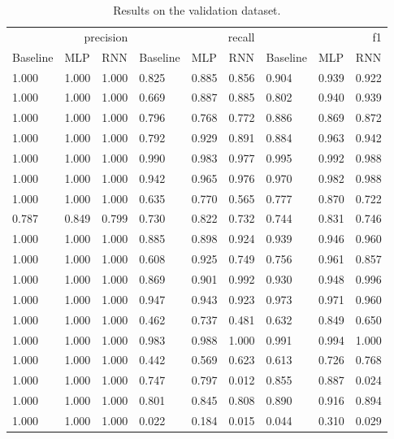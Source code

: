 \begin{table}
\caption{Results on the validation dataset.}
\label{tab::ex_2_valid}
\begin{tabular}{|l||l||l||l||l||l||l||l||l|}
\toprule
\multicolumn{3}{r}{precision} & \multicolumn{3}{r}{recall} & \multicolumn{3}{r}{f1} \\
Baseline & MLP & RNN & Baseline & MLP & RNN & Baseline & MLP & RNN \\
\midrule
1.000 & 1.000 & 1.000 & 0.825 & 0.885 & 0.856 & 0.904 & 0.939 & 0.922 \\
1.000 & 1.000 & 1.000 & 0.669 & 0.887 & 0.885 & 0.802 & 0.940 & 0.939 \\
1.000 & 1.000 & 1.000 & 0.796 & 0.768 & 0.772 & 0.886 & 0.869 & 0.872 \\
1.000 & 1.000 & 1.000 & 0.792 & 0.929 & 0.891 & 0.884 & 0.963 & 0.942 \\
1.000 & 1.000 & 1.000 & 0.990 & 0.983 & 0.977 & 0.995 & 0.992 & 0.988 \\
1.000 & 1.000 & 1.000 & 0.942 & 0.965 & 0.976 & 0.970 & 0.982 & 0.988 \\
1.000 & 1.000 & 1.000 & 0.635 & 0.770 & 0.565 & 0.777 & 0.870 & 0.722 \\
0.787 & 0.849 & 0.799 & 0.730 & 0.822 & 0.732 & 0.744 & 0.831 & 0.746 \\
1.000 & 1.000 & 1.000 & 0.885 & 0.898 & 0.924 & 0.939 & 0.946 & 0.960 \\
1.000 & 1.000 & 1.000 & 0.608 & 0.925 & 0.749 & 0.756 & 0.961 & 0.857 \\
1.000 & 1.000 & 1.000 & 0.869 & 0.901 & 0.992 & 0.930 & 0.948 & 0.996 \\
1.000 & 1.000 & 1.000 & 0.947 & 0.943 & 0.923 & 0.973 & 0.971 & 0.960 \\
1.000 & 1.000 & 1.000 & 0.462 & 0.737 & 0.481 & 0.632 & 0.849 & 0.650 \\
1.000 & 1.000 & 1.000 & 0.983 & 0.988 & 1.000 & 0.991 & 0.994 & 1.000 \\
1.000 & 1.000 & 1.000 & 0.442 & 0.569 & 0.623 & 0.613 & 0.726 & 0.768 \\
1.000 & 1.000 & 1.000 & 0.747 & 0.797 & 0.012 & 0.855 & 0.887 & 0.024 \\
1.000 & 1.000 & 1.000 & 0.801 & 0.845 & 0.808 & 0.890 & 0.916 & 0.894 \\
1.000 & 1.000 & 1.000 & 0.022 & 0.184 & 0.015 & 0.044 & 0.310 & 0.029 \\
\bottomrule
\end{tabular}
\end{table}
